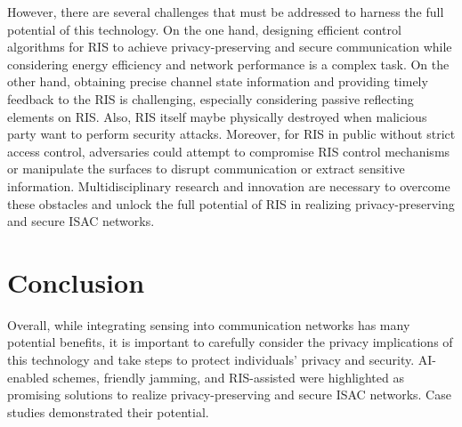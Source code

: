 \documentclass[10pt,journal,twocolumn,twoside]{IEEEtran} %
\begin{document}
However, there are several challenges that must be addressed to harness the full potential of this technology. On the one hand, designing efficient control algorithms for RIS to achieve privacy-preserving and secure communication while considering energy efficiency and network performance is a complex task. On the other hand, obtaining precise channel state information and providing timely feedback to the RIS is challenging, especially considering passive reflecting elements on RIS. Also, RIS itself maybe physically destroyed when malicious party 
want to perform security attacks. Moreover, for RIS in public without strict access control, adversaries could attempt to compromise RIS control mechanisms or manipulate the surfaces to disrupt communication or extract sensitive information. Multidisciplinary research and innovation are necessary to overcome these obstacles and unlock the full potential of RIS in realizing privacy-preserving and secure ISAC networks.  

\section{Conclusion}
Overall, while integrating sensing into communication networks has many potential benefits, it is important to carefully consider the privacy implications of this technology and take steps to protect individuals' privacy and security. AI-enabled schemes, friendly jamming, and RIS-assisted were highlighted as promising solutions to realize privacy-preserving and secure ISAC networks. Case studies demonstrated their potential.

 



\end{document}
